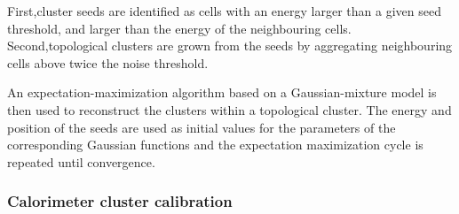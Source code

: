 First,cluster seeds are identified as cells with an energy larger than a given seed threshold, and larger than the energy of the neighbouring cells. Second,topological clusters are grown from the seeds by aggregating neighbouring cells above twice the noise threshold.

An expectation-maximization algorithm based on a Gaussian-mixture model is then used to reconstruct the clusters within a topological cluster. The energy and position of the seeds are used as initial values for the parameters of the corresponding Gaussian functions and the expectation maximization cycle is repeated until convergence.

\subsubsection{Calorimeter cluster calibration}

